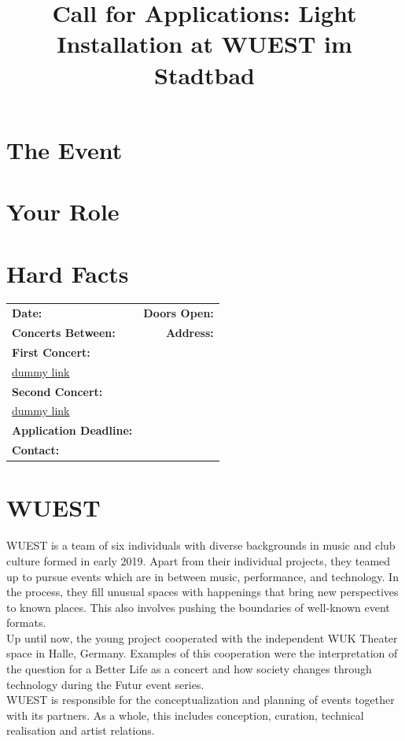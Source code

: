 \documentclass[a4paper, 11pt]{memoir}
\title{Call for Applications: Light Installation at WUEST im Stadtbad}
\begin{document}
    \pagestyle{empty}

    \maketitle

    \section*{The Event}

    \section*{Your Role}

    \section*{Hard Facts}

    \begin{tabular}{lr}

        \textbf{Date:} & \textbf{Doors Open:} \\
        \textbf{Concerts Between:} & \textbf{Address:} \\
        \textbf{First Concert:} \\
        \href{www.duckduckgo.com}{dummy link} \\
        \textbf{Second Concert:} \\
        \href{www.duckduckgo.com}{dummy link} \\
        \textbf{Application Deadline:} \\
        \textbf{Contact:} \\


    \end{tabular}

    \section*{WUEST}
    WUEST is a team of six individuals with diverse backgrounds in music and club 
    culture formed in early 2019. Apart from their individual projects, they 
    teamed up to pursue events which are in between music, performance, and 
    technology. In the process, they fill unusual spaces with happenings that 
    bring new perspectives to known places. This also involves pushing the boundaries 
    of well-known event formats. \\
    Up until now, the young project cooperated with the independent WUK Theater space 
    in Halle, Germany. Examples of this cooperation were the interpretation of the
    question for a Better Life as a concert and how society changes through 
    technology during the Futur event series. \\
    WUEST is responsible for the conceptualization and planning of events together 
    with its partners. As a whole, this includes conception, curation, technical 
    realisation and artist relations.
\end{document}
